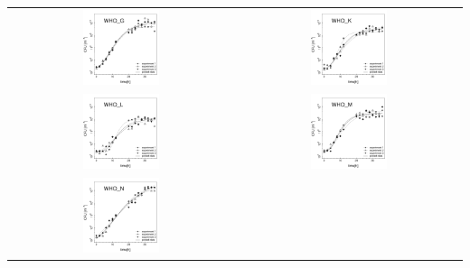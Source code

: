 \documentclass{article}
\begin{document}


\begin{center}
\centering
\begin{tabularx}{1\textwidth}{cc}
\includegraphics[trim = 0mm 0mm 0mm 0mm, clip,width=0.35\textwidth]{WHO_G} &
\includegraphics[trim = 0mm 0mm 0mm 0mm, clip,width=0.35\textwidth]{WHO_K}\\    
\includegraphics[trim = 0mm 0mm 0mm 0mm, clip,width=0.35\textwidth]{WHO_L} &  
\includegraphics[trim = 0mm 0mm 0mm 0mm, clip,width=0.35\textwidth]{WHO_M}   \\
 \includegraphics[trim = 0mm 0mm 0mm 0mm, clip,width=0.35\textwidth]{WHO_N} & \\ 

\end{tabularx}
\end{center}
\flushleft
\end{document}
